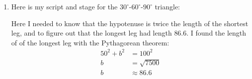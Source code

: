 \documentclass[handout,noauthor,nooutcomes]{ximera}
\begin{document}
\begin{question}
\begin{freeResponse}
\begin{enumerate}
    \item Here is my script and stage for the $30^\circ$-$60^\circ$-$90^\circ$ triangle:
      \begin{center}
        \qquad
      \end{center}
      Here I needed to know that the hypotenuse is twice the length of
      the shortest leg, and to figure out that the longest leg had
      length $86.6$.  I found the length of of the longest leg with
      the Pythagorean theorem:
      \begin{align*}
      50^2 + b^2 &= 100^2\\
      b &= \sqrt{7500}\\
      b &\approx 86.6
      \end{align*}
    

\end{enumerate}
\end{freeResponse}
\end{question}
\end{document}
